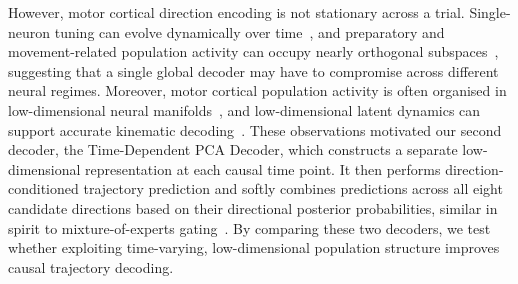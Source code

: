 However, motor cortical direction encoding is not stationary across a trial. Single-neuron tuning can evolve dynamically over time~\cite{rickert2009dynamic}, and preparatory and movement-related population activity can occupy nearly orthogonal subspaces~\cite{elsayed2016reorganization}, suggesting that a single global decoder may have to compromise across different neural regimes. Moreover, motor cortical population activity is often organised in low-dimensional neural manifolds~\cite{gallego2017neural}, and low-dimensional latent dynamics can support accurate kinematic decoding~\cite{aghagolzadeh2016inference}. These observations motivated our second decoder, the Time-Dependent PCA Decoder, which constructs a separate low-dimensional representation at each causal time point. It then performs direction-conditioned trajectory prediction and softly combines predictions across all eight candidate directions based on their directional posterior probabilities, similar in spirit to mixture-of-experts gating~\cite{jacobs1991adaptive}. By comparing these two decoders, we test whether exploiting time-varying, low-dimensional population structure improves causal trajectory decoding.